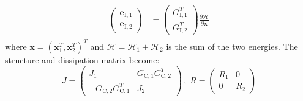 \documentclass[a4paper,twoside, openright,12pt]{report}
\newcommand{\f}[1]{\boldsymbol{#1}}
\newcommand{\g}[1]{\text{#1}}
\begin{document}
{\begin{eqnarray}
\begin{aligned}
	\begin{pmatrix}\f{e}_{\g{I},1} \\ \f{e}_{\g{I},2}\end{pmatrix} &= \begin{pmatrix}G_{\g{I},1}^T \\ G_{\g{I},2}^T\end{pmatrix}\frac{\partial \mathcal{H}}{\partial \f{x}}
\end{aligned}
\end{eqnarray}
where $ \f{x} = (\f{x}_1^T, \f{x}_2^T)^T $ and $\mathcal{H}  = \mathcal{H}_1 + \mathcal{H}_2 $ is the sum of the two energies. The structure and dissipation matrix become:
\[J = \begin{pmatrix} J_1 & G_{\g{C},1} G_{\g{C},2}^T \\ 
-G_{\g{C},2} G_{\g{C},1}^T & J_2\end{pmatrix} \, , \; 
R = \begin{pmatrix}
R_1 & 0 \\ 0 & R_2\end{pmatrix}\]

}
\end{document}
